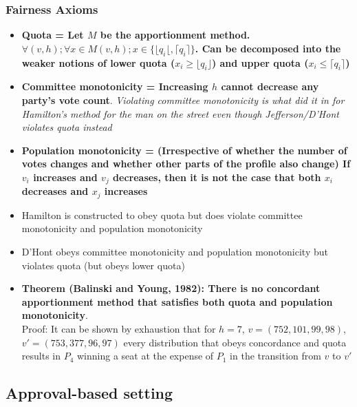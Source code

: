 \documentclass[20pt,a4paper,landscape]{extarticle}
\begin{document}
\begin{flushleft}
\subsubsection{Fairness Axioms}
\begin{itemize}
\item \textbf{Quota = Let $M$ be the apportionment method. $\forall (v, h); \forall x \in M(v, h); x \in \{\lfloor q_i \lfloor, \lceil q_i \rceil\}$. Can be decomposed into the weaker notions of lower quota ($x_i \geq \lfloor q_i \rfloor$) and upper quota ($x_i \leq \lceil q_i \rceil$)}
\item \textbf{Committee monotonicity = Increasing $h$ cannot decrease any party's vote count}. \textit{Violating committee monotonicity is what did it in for Hamilton's method for the man on the street even though Jefferson/D'Hont violates quota instead}
\item \textbf{Population monotonicity = (Irrespective of whether the number of votes changes and whether other parts of the profile also change) If $v_i$ increases and $v_j$ decreases, then it is not the case that both $x_i$ decreases and $x_j$ increases}
\item Hamilton is constructed to obey quota but does violate committee monotonicity and population monotonicity
\item D'Hont obeys committee monotonicity and population monotonicity but violates quota (but obeys lower quota)
\item \textbf{Theorem (Balinski and Young, 1982): There is no concordant apportionment method that satisfies both quota and population monotonicity}.\\
Proof: It can be shown by exhaustion that for $h = 7$, $v = (752, 101, 99, 98)$, $v' = (753, 377, 96, 97)$ every distribution that obeys concordance and quota results in $P_4$ winning a seat at the expense of $P_1$ in the transition from $v$ to $v'$
\end{itemize}
\subsection{Approval-based setting}

\end{flushleft}
\end{document}
